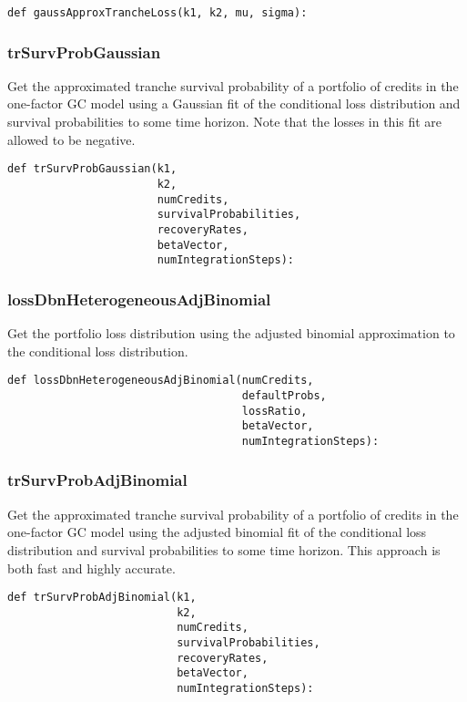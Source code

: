 \documentclass[twoside,11pt]{book}
\begin{document}
\begin{lstlisting}
def gaussApproxTrancheLoss(k1, k2, mu, sigma):
\end{lstlisting}

\subsubsection*{{\bf trSurvProbGaussian}}
Get the approximated tranche survival probability of a portfolio of credits in the one-factor GC model using a Gaussian fit of the conditional loss distribution and survival probabilities to some time horizon. Note that the losses in this fit are allowed to be negative.  

\begin{lstlisting}
def trSurvProbGaussian(k1,
                       k2,
                       numCredits,
                       survivalProbabilities,
                       recoveryRates,
                       betaVector,
                       numIntegrationSteps):
\end{lstlisting}

\subsubsection*{{\bf lossDbnHeterogeneousAdjBinomial}}
Get the portfolio loss distribution using the adjusted binomial approximation to the conditional loss distribution.  

\begin{lstlisting}
def lossDbnHeterogeneousAdjBinomial(numCredits,
                                    defaultProbs,
                                    lossRatio,
                                    betaVector,
                                    numIntegrationSteps):
\end{lstlisting}

\subsubsection*{{\bf trSurvProbAdjBinomial}}
Get the approximated tranche survival probability of a portfolio of credits in the one-factor GC model using the adjusted binomial fit of the conditional loss distribution and survival probabilities to some time horizon. This approach is both fast and highly accurate.  

\begin{lstlisting}
def trSurvProbAdjBinomial(k1,
                          k2,
                          numCredits,
                          survivalProbabilities,
                          recoveryRates,
                          betaVector,
                          numIntegrationSteps):
\end{lstlisting}
\end{document}
